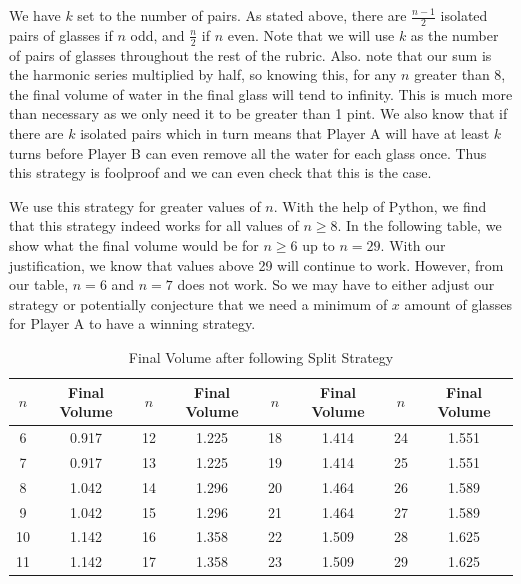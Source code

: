 \documentclass[11pt]{article}
\newcommand{\keywordfont}{\textsc}
\newcommand{\keyword}[1]{%
  \marginpar{\raggedright\small\keywordfont{#1}}}
\begin{document}
We have $k$ set to the \keyword{Justify} number of pairs. As stated above, there are $\frac{n-1}{2}$  isolated pairs of glasses if $n$ odd, and $\frac{n}{2}$ if $n$ even. Note that we will use \keyword{Introduce} $k$ as the number of pairs of glasses throughout the rest of the rubric. Also. note that our sum is the harmonic series multiplied by half, so knowing this, for any $n$ greater than 8, the final volume of water in the final glass will tend to infinity. This is much more than necessary as we only need it to be greater than 1 pint. We also know that if there are $k$ isolated pairs which in turn means that Player A will have at least $k$ turns before Player B can even remove all the water for each glass once. Thus this strategy is foolproof and we can even check that this is the case. 

We use this \keyword{Check}  strategy for greater values of $n$. With the help of Python, we find that this strategy indeed works for all values of $n \geq 8$. In the following table, we show what the final volume would be for $n \geq 6$ up to $n= 29$.  With our justification, we know that values above 29 will continue to work. However, from our table, $n=6$ and $n=7$ does not work. So we may have to either adjust our strategy or potentially conjecture that we need a minimum of $x$ amount of glasses for Player A to have a winning strategy. 

\begin{table}[h]
    \centering
    \renewcommand{\arraystretch}{1.1}
    \begin{tabular}{|c|c|c|c|c|c|c|c|} \hline 
         $n$&  Final Volume&  $n$&  Final Volume&  $n$&  Final Volume&  $n$& Final Volume\\ \hline 
         6
&  0.917
&  12
&  1.225
&  18
&  1.414
&  24
& 1.551
\\ \hline 
         7
&  0.917
&  13
&  1.225
&  19
&  1.414
&  25
& 1.551
\\ \hline 
         8
&  1.042
&  14
&  1.296
&  20
&  1.464
&  26
& 1.589
\\ \hline 
         9
&  1.042
&  15
&  1.296
&  21
&  1.464
&  27
& 1.589
\\ \hline 
 10
& 1.142
& 16
& 1.358
& 22
& 1.509
& 28
&1.625
\\ \hline 
 11
& 1.142
& 17
& 1.358
& 23
& 1.509
& 29
&1.625
\\ \hline
    \end{tabular}
    \caption{Final Volume after following Split Strategy}
    \label{tab:my_label}
\end{table}
\end{document}
